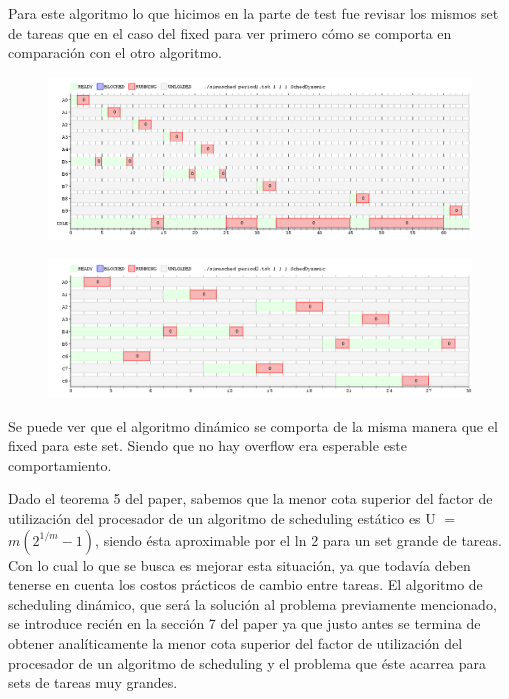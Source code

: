 Para este algoritmo lo que hicimos en la parte de test fue revisar los mismos set de tareas que en el caso del fixed para ver primero cómo se comporta en comparación con el otro algoritmo.


\begin{figure}[H]
  \centering
\includegraphics[scale=0.45]{dynamic/period1D.png}
  \caption[Algoritmo Fixed]{}
\end{figure}

\begin{figure}[H]
  \centering
\includegraphics[scale=0.45]{dynamic/period2D.png}
  \caption[Algoritmo Dinamico]{}
\end{figure}

Se puede ver que el algoritmo dinámico se comporta de la misma manera que el fixed para este set. Siendo que no hay overflow era esperable este comportamiento.

Dado el teorema 5 del paper, sabemos que la menor cota superior del factor de utilización del procesador de un algoritmo de scheduling estático es U $=$ $m(2^{1/m}-1)$, siendo ésta aproximable por el ln 2 para un set grande de tareas. Con lo cual lo que se busca es mejorar esta situación, ya que todavía deben tenerse en cuenta los costos prácticos de cambio entre tareas. El algoritmo de scheduling dinámico, que será la solución al problema previamente mencionado, se introduce recién en la sección 7 del paper ya que justo antes se termina de obtener analíticamente la menor cota superior del factor de utilización del procesador de un algoritmo de scheduling y el problema que éste acarrea para sets de tareas muy grandes.


